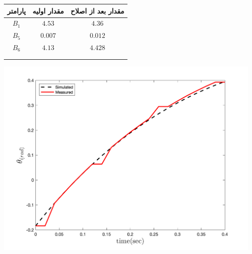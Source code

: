   \begin{minipage}[H]{\linewidth}
	\hfill
	\begin{minipage}[b]{0.49\linewidth}
		\centering
		\begin{tabular}{ccc}\hline
			پارامتر & مقدار اولیه  & مقدار بعد از اصلاح
			\\ \hline
			$B_1$  & $4.53$ & $4.36$ \\
			$B_5$ & $0.007$ & $0.012$\\
			$B_6$ & $4.13$ & $4.428$\\ \hline
			\\\\
		\end{tabular}
	\captionsetup{justification=centering}
	\end{minipage}
	\begin{minipage}[b]{0.48\linewidth}
		\centering
		\includegraphics[width=1\linewidth]{../Figures/RCP/pitch_ml_parameter_estimation/RCP_pitch_S1.png}
		\captionsetup{justification=centering}
	\end{minipage}
\end{minipage}

